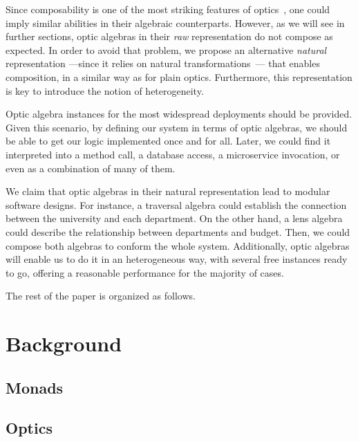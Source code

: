 \documentclass[a4paper]{article}
\begin{document}
Since composability is one of the most striking features of
optics~\cite{pickering2017profunctor}, one could imply similar abilities in
their algebraic counterparts. However, as we will see in further sections, optic
algebras in their \emph{raw} representation do not compose as expected. In order
to avoid that problem, we propose an alternative \emph{natural} representation
---since it relies on natural transformations~\cite{pierce1991basic}--- that
enables composition, in a similar way as for plain optics. Furthermore, this
representation is key to introduce the notion of heterogeneity.


Optic algebra instances for the most widespread deployments should be provided.
Given this scenario, by defining our system in terms of optic algebras, we
should be able to get our logic implemented once and for all. Later, we could
find it interpreted into a method call, a database access, a microservice
invocation, or even as a combination of many of them.


We claim that optic algebras in their natural representation lead to modular
software designs. For instance, a traversal algebra could establish the
connection between the university and each department. On the other hand, a lens
algebra could describe the relationship between departments and budget. Then, we
could compose both algebras to conform the whole system. Additionally, optic
algebras will enable us to do it in an heterogeneous way, with several free
instances ready to go, offering a reasonable performance for the majority of
cases.


The rest of the paper is organized as follows.

\section{Background}

\subsection{Monads}

\subsection{Optics}
\label{sub:background.optics}
\end{document}
